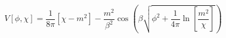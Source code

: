 \begin{equation}
V[\phi,\chi] = \frac{1}{8 \pi} [\chi -m^2] -\frac{m^2}{\beta^2} \cos \left(
\beta \sqrt{\phi^2+
\frac{1}{4 \pi} \ln[\frac{m^2}{\chi}]} \right)
\end{equation}

